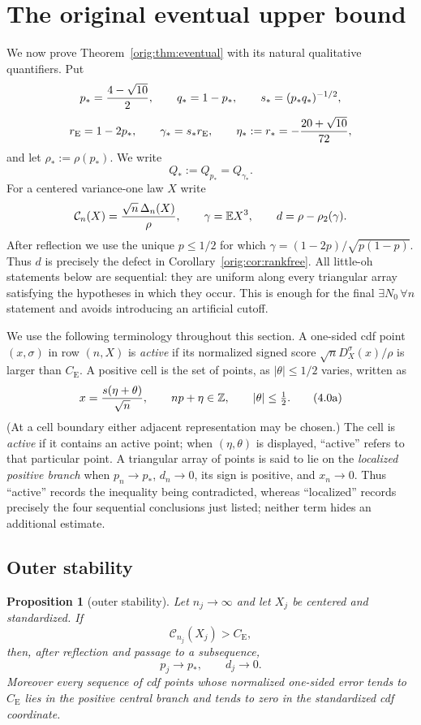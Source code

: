 \documentclass[11pt,a4paper]{article}
\numberwithin{equation}{section}
\newtheorem{proposition}[theorem]{Proposition}
\theoremstyle{definition}
\theoremstyle{remark}
\newcommand{\E}{\mathbb E}
\newcommand{\CE}{C_{\mathrm E}}
\begin{document}
\section{The original eventual upper bound}\label{orig:sec:eventual}

We now prove Theorem~\ref{orig:thm:eventual} with its natural qualitative
quantifiers.  Put
\[
 p_*={4-\sqrt {10}\over2},\qquad q_*=1-p_*,
 \qquad s_*=(p_*q_*)^{-1/2},
\]
\[
 r_{\rm E}=1-2p_*,\qquad \gamma_*=s_*r_{\rm E},
 \qquad \eta_*:=r_*=-{20+\sqrt {10}\over72},
\]
 and let $\rho_*:=\rho(p_*)$.  We write
 \[
                  Q_*:=Q_{p_*}=Q_{\gamma_*}.             \tag{4.0}
 \]
 For a centered variance-one law $X$ write
\[
 \mathcal C_n(X)={\sqrt n\,\Delta_n(X)\over\rho},\qquad
 \gamma=\E X^3,\qquad d=\rho-\rho_2(\gamma).
\]
After reflection we use the unique $p\le1/2$ for which
$\gamma=(1-2p)/\sqrt{p(1-p)}$.  Thus $d$ is precisely the defect in
Corollary~\ref{orig:cor:rankfree}.  All little-oh statements below are sequential:
they are uniform along every triangular array satisfying the hypotheses in
which they occur.  This is enough for the final $\exists N_0\,\forall n$
statement and avoids introducing an artificial cutoff.

We use the following terminology throughout this section.  A one-sided cdf
point $(x,\sigma)$ in row $(n,X)$ is \emph{active} if its normalized signed
score $\sqrt nD_X^\sigma(x)/\rho$ is larger than $\CE$.  A positive cell is
the set of points, as $|\theta|\le1/2$ varies, written as
\[
 x={s(\eta+\theta)\over\sqrt n},\qquad np+\eta\in\mathbb Z,
 \qquad |\theta|\le\tfrac12.                              \tag{4.0a}
\]
(At a cell boundary either adjacent representation may be chosen.)  The
cell is \emph{active} if it contains an active point; when $(\eta,\theta)$
is displayed, ``active'' refers to that particular point.  A
triangular array of points is said to lie on the \emph{localized positive
branch} when $p_n\to p_*$, $d_n\to0$, its sign is positive, and $x_n\to0$.
Thus ``active'' records the inequality being contradicted, whereas
``localized'' records precisely the four sequential conclusions just
listed; neither term hides an additional estimate.

\subsection*{Outer stability}

\begin{proposition}[outer stability]\label{orig:prop:qouter}
Let $n_j\to\infty$ and let $X_j$ be centered and standardized.  If
\[
                    \mathcal C_{n_j}(X_j)>\CE,         \tag{OS0}
\]
then, after reflection and passage to a subsequence,
\[
                    p_j\longrightarrow p_*,\qquad d_j\longrightarrow0.
                                                               \tag{OS}
\]
Moreover every sequence of cdf points whose normalized one-sided error
tends to $\CE$ lies in the positive central branch and tends to zero in
the standardized cdf coordinate.
\end{proposition}
\end{document}
